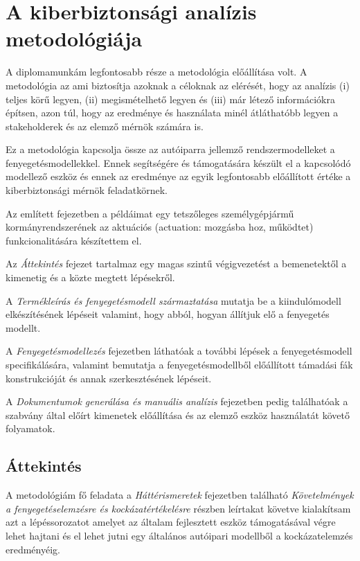 \chapter{A kiberbiztonsági analízis metodológiája}

A diplomamunkám legfontosabb része a metodológia előállítása volt. A metodológia az ami biztosítja azoknak a céloknak az elérését, hogy az analízis (i) teljes körű legyen, (ii) megismételhető legyen és (iii) már létező információkra építsen, azon túl, hogy az eredménye és használata minél átláthatóbb legyen a stakeholderek és az elemző mérnök számára is.

Ez a metodológia kapcsolja össze az autóiparra jellemző rendszermodelleket a fenyegetésmodellekkel. Ennek segítségére és támogatására készült el a kapcsolódó modellező eszköz és ennek az eredménye az egyik legfontosabb előállított értéke a kiberbiztonsági mérnök feladatkörnek.

Az említett fejezetben a példáimat egy tetszőleges személygépjármű kormányrendszerének az aktuációs (actuation: mozgásba hoz, működtet) funkcionalitására készítettem el. 

Az \textit{Áttekintés} fejezet tartalmaz egy magas szintű végigvezetést a bemenetektől a kimenetig és a közte megtett lépésekről.

A \textit{Termékleírás és fenyegetésmodell származtatása} mutatja be a kiindulómodell elkészítésének lépéseit valamint, hogy abból, hogyan állítjuk elő a fenyegetés modellt.

A \textit{Fenyegetésmodellezés} fejezetben láthatóak a további lépések a fenyegetésmodell specifikálására, valamint bemutatja a fenyegetésmodellből előállított támadási fák konstrukcióját és annak szerkesztésének lépéseit.

A \textit{Dokumentumok generálása és manuális analízis} fejezetben pedig találhatóak a szabvány által előírt kimenetek előállítása és az elemző eszköz használatát követő folyamatok.

\section{Áttekintés}

A metodológiám fő feladata a \textit{Háttérismeretek} fejezetben található \textit{Követelmények a fenyegetéselemzésre és kockázatértékelésre} részben leírtakat követve kialakítsam azt a lépéssorozatot amelyet az általam fejlesztett eszköz támogatásával végre lehet hajtani és el lehet jutni egy általános autóipari modellből a kockázatelemzés eredményéig.

